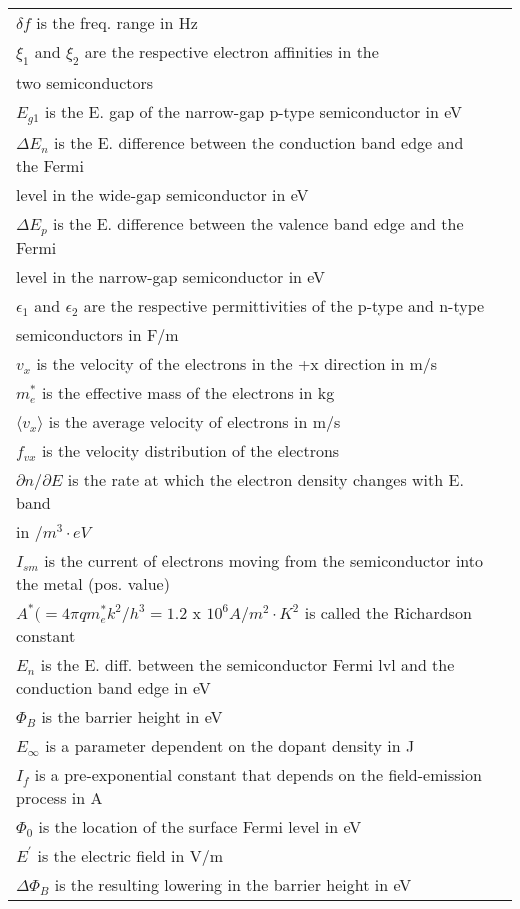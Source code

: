 \documentclass[10pt,landscape]{article}
\begin{document}
\begin{multicols}{3}
\begin{tabular}{@{}ll@{}}
$ \delta f$ is the freq. range in Hz \\
$ \xi_1$ and $\xi_2$ are the respective electron affinities in the \\
two semiconductors \\
$ E_{g1}$ is the E. gap of the narrow-gap p-type semiconductor in eV \\
$ \Delta E_n$ is the E. difference between the conduction band edge and the Fermi \\
level in the wide-gap semiconductor in eV \\
$ \Delta E_p$ is the E. difference between the valence band edge and the Fermi \\
level in the narrow-gap semiconductor in eV \\
$ \epsilon_1$ and $\epsilon_2$ are the respective permittivities of the p-type and n-type \\
semiconductors in F/m \\
$ v_x$ is the velocity of the electrons in the +x direction in m/s \\
$ m^*_e$ is the effective mass of the electrons in kg \\
$ \langle v_x\rangle$ is the average velocity of electrons in m/s \\
$ f_{vx}$ is the velocity distribution of the electrons \\
$ \partial n/\partial E$ is the rate at which the electron density changes with E. band\\
in $/m^3\cdot eV$  \\
$ I_{sm}$ is the current of electrons moving from the semiconductor into the metal (pos. value)\\
$ A^* (=4\pi qm^*_ek^2/h^3=1.2$ x $10^6 A/m^2\cdot K^2$ is called the Richardson constant \\
$ E_n$ is the E. diff. between the semiconductor Fermi lvl and the conduction band edge in eV \\
$ \Phi_{B}$ is the barrier height in eV \\
$ E_{\infty}$ is a parameter dependent on the dopant density in J \\
$ I_f$ is a pre-exponential constant that depends on the field-emission process in A \\
$ \Phi_0$ is the location of the surface Fermi level in eV \\
$ E^{\prime}$ is the electric field in V/m \\
$ \Delta\Phi_B$ is the resulting lowering in the barrier height in eV \\

\end{tabular}
\end{multicols}
\end{document}
